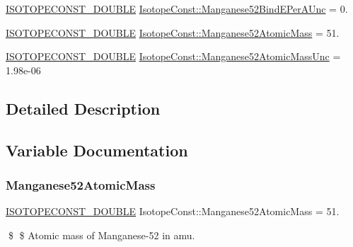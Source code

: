 \begin{DoxyCompactItemize}
\mbox{\hyperlink{group___isotope_const-_macros_ga8f45a7272ce02c0b4c65c44636ed719a}{I\+S\+O\+T\+O\+P\+E\+C\+O\+N\+S\+T\+\_\+\+D\+O\+U\+B\+LE}} \mbox{\hyperlink{group___isotope_const-_manganese-_mn52_gaff36b4ccfcb65ae4e87bdde4eac4310a}{Isotope\+Const\+::\+Manganese52\+Bind\+E\+Per\+A\+Unc}} = 0.
\item 
\mbox{\hyperlink{group___isotope_const-_macros_ga8f45a7272ce02c0b4c65c44636ed719a}{I\+S\+O\+T\+O\+P\+E\+C\+O\+N\+S\+T\+\_\+\+D\+O\+U\+B\+LE}} \mbox{\hyperlink{group___isotope_const-_manganese-_mn52_gacab3d5bd7397fafd30b644a1a92274ed}{Isotope\+Const\+::\+Manganese52\+Atomic\+Mass}} = 51.
\item 
\mbox{\hyperlink{group___isotope_const-_macros_ga8f45a7272ce02c0b4c65c44636ed719a}{I\+S\+O\+T\+O\+P\+E\+C\+O\+N\+S\+T\+\_\+\+D\+O\+U\+B\+LE}} \mbox{\hyperlink{group___isotope_const-_manganese-_mn52_ga77e581d28239c21ccf5c94be6d2cbdb1}{Isotope\+Const\+::\+Manganese52\+Atomic\+Mass\+Unc}} = 1.\+98e-\/06
\end{DoxyCompactItemize}


\subsection{Detailed Description}


\subsection{Variable Documentation}
\mbox{\label{group___isotope_const-_manganese-_mn52_gacab3d5bd7397fafd30b644a1a92274ed}} 
\subsubsection{\texorpdfstring{Manganese52\+Atomic\+Mass}{Manganese52AtomicMass}}
{\footnotesize\ttfamily \mbox{\hyperlink{group___isotope_const-_macros_ga8f45a7272ce02c0b4c65c44636ed719a}{I\+S\+O\+T\+O\+P\+E\+C\+O\+N\+S\+T\+\_\+\+D\+O\+U\+B\+LE}} Isotope\+Const\+::\+Manganese52\+Atomic\+Mass = 51.}

\$ \$ Atomic mass of Manganese-\/52 in amu. \mbox{\label{group___isotope_const-_manganese-_mn52_ga77e581d28239c21ccf5c94be6d2cbdb1}} 
